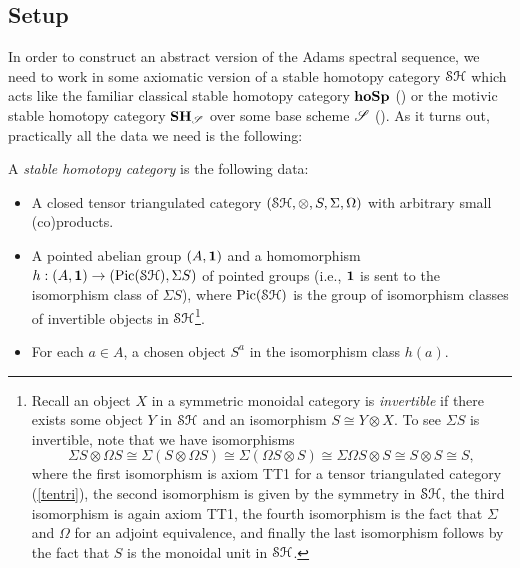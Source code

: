 \documentclass[../main.tex]{subfiles}
\begin{document}
\subsection{Setup}\label{setup}

In order to construct an abstract version of the Adams spectral sequence, we need to work in some axiomatic version of a stable homotopy category $\mathcal{SH}$ which acts like the familiar classical stable homotopy category $\mathbf{hoSp}$ () or the motivic stable homotopy category $\mathbf{SH}_{\mathscr{S}}$ over some base scheme $\mathscr{S}$ (). As it turns out, practically all the data we need is the following:

\begin{definition}\label{stable_homotopy_cat}
	A \emph{stable homotopy category} is the following data:
	\begin{itemize}
		\item A closed tensor triangulated category $(\mathcal{SH},\otimes,S,\Sigma,\Omega)$ with arbitrary small (co)products.
		\item A pointed abelian group $(A,\mathbf{1})$ and a homomorphism $h:(A,\mathbf{1})\to(\operatorname{Pic}(\mathcal{SH}),\Sigma S)$ of pointed groups (i.e., $\mathbf{1}$ is sent to the isomorphism class of $\Sigma S$), where $\operatorname{Pic}(\mathcal{SH})$ is the group of isomorphism classes of invertible objects in $\mathcal{SH}$\footnote{Recall an object $X$ in a symmetric monoidal category is \textit{invertible} if there exists some object $Y$ in $\mathcal{SH}$ and an isomorphism $S\cong Y\otimes X$. To see $\Sigma S$ is invertible, note that we have isomorphisms
		\[\Sigma S\otimes \Omega S\cong\Sigma(S\otimes\Omega S)\cong \Sigma(\Omega S\otimes S)\cong\Sigma\Omega S\otimes S\cong S\otimes S\cong S,\]
		where the first isomorphism is axiom TT1 for a tensor triangulated category (\autoref{tentri}), the second isomorphism is given by the symmetry in $\mathcal{SH}$, the third isomorphism is again axiom TT1, the fourth isomorphism is the fact that $\Sigma$ and $\Omega$ for an adjoint equivalence, and finally the last isomorphism follows by the fact that $S$ is the monoidal unit in $\mathcal{SH}$.}.
		\item For each $a\in A$, a chosen object $S^a$ in the isomorphism class $h(a)$.
	\end{itemize}
\end{definition}
\end{document}
